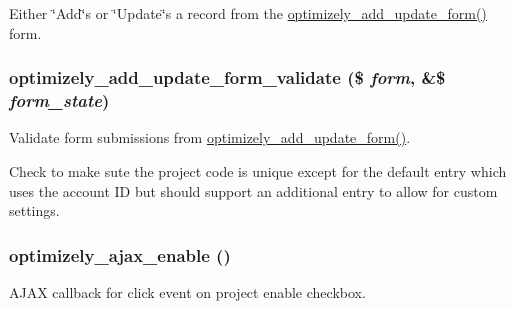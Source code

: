 Either \char`\"{}Add\char`\"{}s or \char`\"{}Update\char`\"{}s a record from the \hyperlink{optimizely_8admin_8inc_a0fc8c1fbac099f105600ffd2865754fb}{optimizely\_\-add\_\-update\_\-form()} form. \hypertarget{optimizely_8admin_8inc_a0c8b48847f329db64088c055f76fd454}{
\subsubsection[{optimizely\_\-add\_\-update\_\-form\_\-validate}]{\setlength{\rightskip}{0pt plus 5cm}optimizely\_\-add\_\-update\_\-form\_\-validate (\$ {\em form}, \/  \&\$ {\em form\_\-state})}}
\label{optimizely_8admin_8inc_a0c8b48847f329db64088c055f76fd454}
Validate form submissions from \hyperlink{optimizely_8admin_8inc_a0fc8c1fbac099f105600ffd2865754fb}{optimizely\_\-add\_\-update\_\-form()}.

Check to make sute the project code is unique except for the default entry which uses the account ID but should support an additional entry to allow for custom settings. \hypertarget{optimizely_8admin_8inc_ab7a52ffd4af3ee7365abfbd565aded63}{
\subsubsection[{optimizely\_\-ajax\_\-enable}]{\setlength{\rightskip}{0pt plus 5cm}optimizely\_\-ajax\_\-enable ()}}
\label{optimizely_8admin_8inc_ab7a52ffd4af3ee7365abfbd565aded63}
AJAX callback for click event on project enable checkbox.

